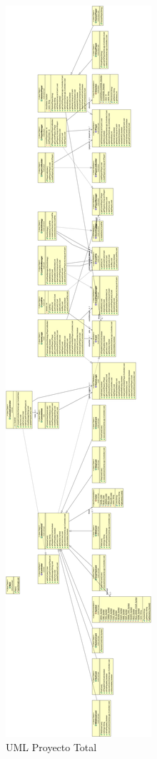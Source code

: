 \documentclass[letterpaper,11pt]{article}
\begin{document}
\begin{figure}[H]
\center
\includegraphics[scale=0.13]{UMLTarea2foto.png}
\caption{UML Proyecto Total}
\end{figure}
\end{document}

